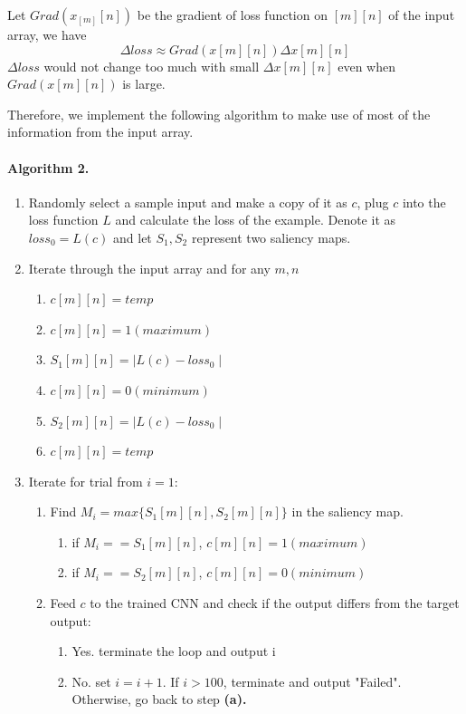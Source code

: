 \documentclass{article}
\begin{document}
Let $Grad(x_[m][n])$ be the gradient of loss function on $[m][n]$ of the input array, we have 
\begin{equation}
	\Delta loss \approx Grad(x[m][n])\Delta x[m][n]
\end{equation}
$\Delta loss$ would not change too much with small $\Delta x[m][n]$ even when $Grad(x[m][n])$ is large.

Therefore, we implement the following algorithm to make use of most of the information from the input array.

\paragraph{Algorithm 2.}
\begin{enumerate}
	\item Randomly select a sample input and make a copy of it as $c$, plug $c$ into the loss function $L$ and calculate the loss of the example. Denote it as $loss_0=L(c)$ and let $S_1,S_2$ represent two saliency maps.
	\item Iterate through the input array and for any $m,n$
		\begin{enumerate}
			\item $c[m][n]=temp$
			\item $c[m][n]=1(maximum)$
			\item $S_1[m][n]= \mid L(c) - loss_0 \mid$
			\item $c[m][n]=0(minimum)$
			\item $S_2[m][n]=\mid L(c) - loss_0 \mid$
			\item $c[m][n]=temp$
		\end{enumerate}

	\item Iterate for trial from $i=1$:
		\begin{enumerate}
			\item Find $M_i=max\{S_1[m][n],S_2[m][n]\}$ in the saliency map.
				\begin{enumerate}
					\item if $M_i==S_1[m][n]$, $c[m][n]=1(maximum)$
					\item if $M_i==S_2[m][n]$, $c[m][n]=0(minimum)$
				\end{enumerate}
			\item Feed $c$ to the trained CNN and check if the output differs from the target output:
				\begin{enumerate}
					\item Yes. terminate the loop and output i
					\item No. set $i=i+1$. If $i > 100$, terminate and output "Failed". Otherwise, go back to step \textbf{(a).}
				\end{enumerate}
		\end{enumerate}
\end{enumerate}
\end{document}
